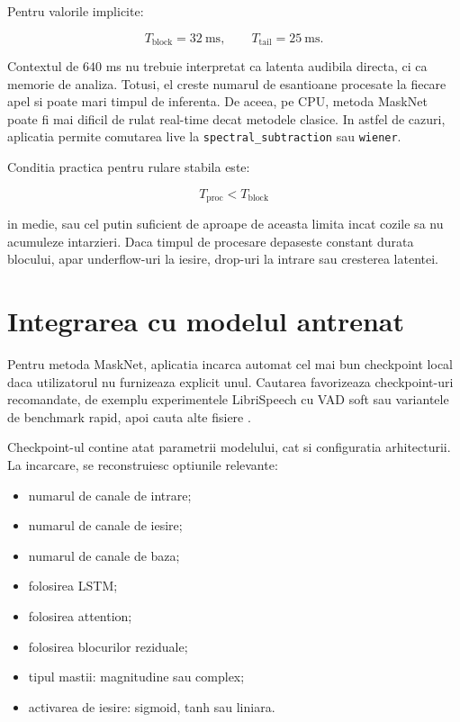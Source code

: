 Pentru valorile implicite:

\[
T_{\text{block}} = 32 \ \text{ms},
\qquad
T_{\text{tail}} = 25 \ \text{ms}.
\]

Contextul de \(640\) ms nu trebuie interpretat ca latenta audibila directa, ci
ca memorie de analiza. Totusi, el creste numarul de esantioane procesate la
fiecare apel si poate mari timpul de inferenta. De aceea, pe CPU, metoda MaskNet
poate fi mai dificil de rulat real-time decat metodele clasice. In astfel de
cazuri, aplicatia permite comutarea live la \texttt{spectral\_subtraction} sau
\texttt{wiener}.

Conditia practica pentru rulare stabila este:

\[
T_{\text{proc}} < T_{\text{block}}
\]

in medie, sau cel putin suficient de aproape de aceasta limita incat cozile sa
nu acumuleze intarzieri. Daca timpul de procesare depaseste constant durata
blocului, apar underflow-uri la iesire, drop-uri la intrare sau cresterea
latentei.

\section{Integrarea cu modelul antrenat}

Pentru metoda MaskNet, aplicatia incarca automat cel mai bun checkpoint local
daca utilizatorul nu furnizeaza explicit unul. Cautarea favorizeaza checkpoint-uri
recomandate, de exemplu experimentele LibriSpeech cu VAD soft sau variantele de
benchmark rapid, apoi cauta alte fisiere .

Checkpoint-ul contine atat parametrii modelului, cat si configuratia arhitecturii.
La incarcare, se reconstruiesc optiunile relevante:

\begin{itemize}
    \item numarul de canale de intrare;
    \item numarul de canale de iesire;
    \item numarul de canale de baza;
    \item folosirea LSTM;
    \item folosirea attention;
    \item folosirea blocurilor reziduale;
    \item tipul mastii: magnitudine sau complex;
    \item activarea de iesire: sigmoid, tanh sau liniara.
\end{itemize}

